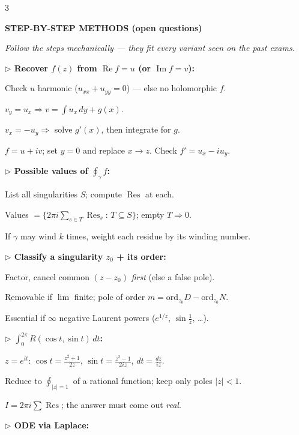 \documentclass[a4paper,8pt]{extarticle}
\newcommand{\topic}[2]{%
  \vspace{4.5pt}%
  {\colorbox{#1}{\parbox{\dimexpr\columnwidth-2\fboxsep}{\color{white}\bfseries\footnotesize #2}}}\par\vspace{2.5pt}}
\newcommand{\Res}{\operatorname{Res}}
\renewcommand{\Re}{\operatorname{Re}}
\renewcommand{\Im}{\operatorname{Im}}
\begin{document}
\begin{multicols}{3}
\topic{cD}{STEP-BY-STEP METHODS (open questions)}
{\itshape Follow the steps mechanically — they fit every variant seen on the past exams.}\par\smallskip
\textbf{\textcolor{cD}{$\triangleright$ Recover $f(z)$ from $\Re f{=}u$ (or $\Im f{=}v$):}}
\begin{recipe}
\item Check $u$ harmonic ($u_{xx}{+}u_{yy}{=}0$) — else no holomorphic $f$.
\item $v_y{=}u_x\Rightarrow v{=}\!\int\! u_x\,dy+g(x)$.
\item $v_x{=}{-}u_y\Rightarrow$ solve $g'(x)$, then integrate for $g$.
\item $f{=}u{+}iv$; set $y{=}0$ and replace $x\to z$. Check $f'{=}u_x{-}iu_y$.
\end{recipe}
\textbf{\textcolor{cD}{$\triangleright$ Possible values of $\oint_\gamma f$:}}
\begin{recipe}
\item List all singularities $S$; compute $\Res$ at each.
\item Values $=\{2\pi i\!\sum_{s\in T}\!\Res_s:\,T\subseteq S\}$; empty $T\Rightarrow 0$.
\item If $\gamma$ may wind $k$ times, weight each residue by its winding number.
\end{recipe}
\textbf{\textcolor{cD}{$\triangleright$ Classify a singularity $z_0$ + its order:}}
\begin{recipe}
\item Factor, cancel common $(z{-}z_0)$ \emph{first} (else a false pole).
\item Removable if $\lim$ finite; pole of order $m{=}\mathrm{ord}_{z_0}D-\mathrm{ord}_{z_0}N$.
\item Essential if $\infty$ negative Laurent powers ($e^{1/z}$, $\sin\tfrac1z$, …).
\end{recipe}
\textbf{\textcolor{cD}{$\triangleright$ $\int_0^{2\pi}R(\cos t,\sin t)\,dt$:}}
\begin{recipe}
\item $z{=}e^{it}$: $\cos t{=}\frac{z^2+1}{2z}$, $\sin t{=}\frac{z^2-1}{2iz}$, $dt{=}\frac{dz}{iz}$.
\item Reduce to $\oint_{|z|=1}$ of a rational function; keep only poles $|z|{<}1$.
\item $I{=}2\pi i\sum\Res$; the answer must come out \emph{real}.
\end{recipe}
\textbf{\textcolor{cD}{$\triangleright$ ODE via Laplace:}}

\end{multicols}
\end{document}
